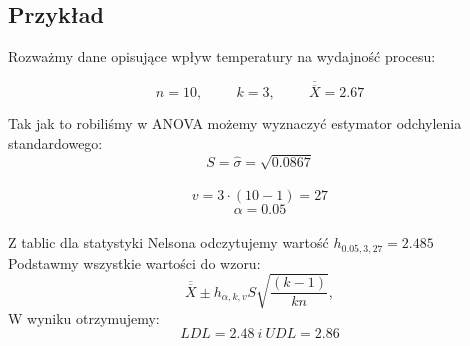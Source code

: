 \documentclass{beamer}
\begin{document}
\subsection{Przykład}
 \begin{frame}
Rozważmy dane opisujące wpływ temperatury na wydajność procesu:\\

\begin{center}
\end{center}

\end{frame}

  \begin{frame}
$$n=10,\hspace{1cm} k=3,\hspace{1cm} \overline{\overline{X}}=2.67$$

Tak jak to robiliśmy w ANOVA możemy wyznaczyć estymator odchylenia standardowego: $$S=\hat{ \sigma}=\sqrt{0.0867} $$\\
$$v = 3\cdot (10-1)=27$$
$$\alpha=0.05$$\\

Z tablic dla statystyki Nelsona odczytujemy wartość $h_{0.05,3,27}=2.485$\\

Podstawmy wszystkie wartości do wzoru: 
$$ \overline{\overline{X}} \pm  h_{\alpha,k,v}S\sqrt{\frac{(k-1)}{kn}}, $$
W wyniku otrzymujemy:
$$LDL=2.48\ i \ UDL=2.86$$
\end{frame}
\end{document}
